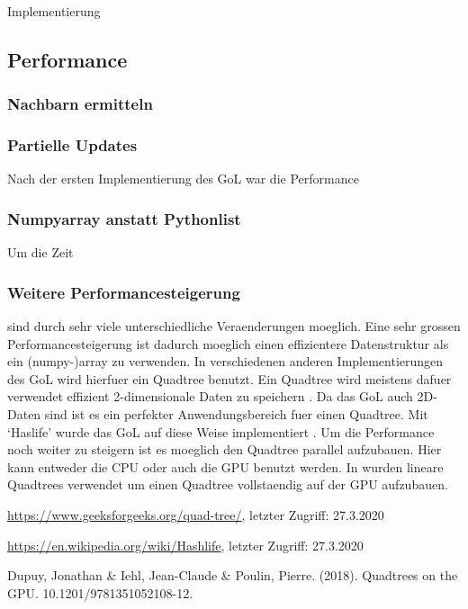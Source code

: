 \documentclass[runningheads]{llncs}
\begin{document}
\begin{section}{Implementierung}
    \subsection{Performance}

    \subsubsection{Nachbarn ermitteln}

    \subsubsection{Partielle Updates}
        Nach der ersten Implementierung des GoL war die Performance 

    \subsubsection{Numpyarray anstatt Pythonlist}
        Um die Zeit 

    
    \subsubsection{Weitere Performancesteigerung}
        sind durch sehr viele unterschiedliche Veraenderungen moeglich.
        Eine sehr grossen Performancesteigerung ist dadurch moeglich einen effizientere Datenstruktur als ein (numpy-)array zu verwenden.
        In verschiedenen anderen Implementierungen des GoL wird hierfuer ein Quadtree benutzt.
        Ein Quadtree wird meistens dafuer verwendet effizient 2-dimensionale Daten zu speichern \cite{quadtreeGeeksForGeeks}.
        Da das GoL auch 2D-Daten sind ist es ein perfekter Anwendungsbereich fuer einen Quadtree.
        Mit `Haslife' wurde das GoL auf diese Weise implementiert \cite{haslifeWiki}. \newline
        Um die Performance noch weiter zu steigern ist es moeglich den Quadtree parallel aufzubauen.
        Hier kann entweder die CPU oder auch die GPU benutzt werden.
        In \cite{quadtreesOnGPU} wurden lineare Quadtrees verwendet um einen Quadtree vollstaendig auf der GPU aufzubauen.

\end{section}


\begin{thebibliography}{8}
    \url{https://www.geeksforgeeks.org/quad-tree/}, letzter Zugriff: 27.3.2020

    \url{https://en.wikipedia.org/wiki/Hashlife}, letzter Zugriff: 27.3.2020

    Dupuy, Jonathan \& Iehl, Jean-Claude \& Poulin, Pierre. (2018).
    Quadtrees on the GPU. 10.1201/9781351052108-12. 

\end{thebibliography}
\end{document}

